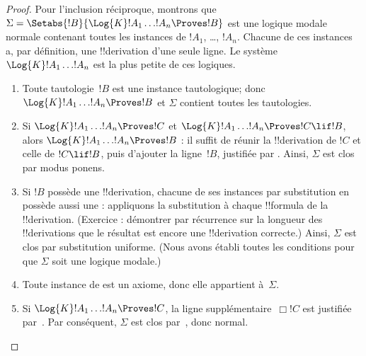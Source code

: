 \documentclass[../../../include/open-logic-section]{subfiles}
\begin{document}
\begin{proof}
  Pour l'inclusion réciproque, montrons que
  $\Sigma = \Setabs{!B}{\Log{K} !A_1 \dots !A_n \Proves !B }$ est une
  logique modale normale contenant toutes les instances de $!A_1$,
  \dots, $!A_n$. Chacune de ces instances a, par définition, une
  !!{derivation} d'une seule ligne. Le système $\Log{K} !A_1
  \dots !A_n$ est la plus petite de ces logiques.
  \begin{enumerate}
    \item Toute tautologie~$!B$ est une instance tautologique; donc
      $\Log{K}!A_1\dots!A_n \Proves !B$ et $\Sigma$ contient toutes
      les tautologies.
    \item Si $\Log{K}!A_1\dots!A_n \Proves !C$ et
      $\Log{K}!A_1\dots!A_n \Proves !C \lif !B$, alors
      $\Log{K}!A_1\dots!A_n \Proves !B$ : il suffit de réunir la
      !!{derivation} de $!C$ et celle de $!C \lif !B$, puis d'ajouter
      la ligne~$!B$, justifiée par \MP{}. Ainsi, $\Sigma$ est clos
      par modus ponens.
    \item Si $!B$ possède une !!{derivation}, chacune de ses instances
      par substitution en possède aussi une : appliquons la
      substitution à chaque !!{formula} de la !!{derivation}.
      (Exercice : démontrer par récurrence sur la longueur des
      !!{derivation}s que le résultat est encore une !!{derivation}
      correcte.) Ainsi, $\Sigma$ est clos par substitution uniforme.
      (Nous avons établi toutes les conditions pour que $\Sigma$
      soit une logique modale.)
    \item Toute instance de  est un axiome, donc elle appartient
      à~$\Sigma$.
    \item Si $\Log{K}!A_1\dots!A_n \Proves !C$, la ligne
      supplémentaire~$\Box !C$ est justifiée par~\Nec. Par
      conséquent, $\Sigma$ est clos par~\Nec, donc normal.
  \end{enumerate}
\end{proof}
\end{document}
